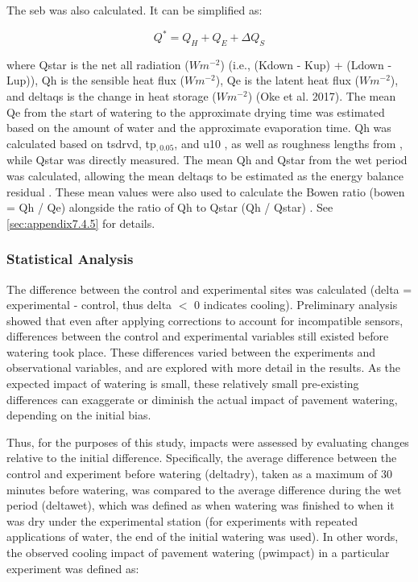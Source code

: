 \documentclass[final,3p,times,authoryear]{elsarticle}
\begin{document}
The \gls{seb} was also calculated. It can be simplified as:

\begin{equation}
Q^{*} = Q_{H} + Q_{E} + \Delta Q_{S}
\label{eq:2.1} 
\end{equation}

where \gls{Qstar} is the net all radiation ($Wm^{-2}$) (i.e., (\gls{Kdown} - \gls{Kup}) + (\gls{Ldown} - \gls{Lup})), \gls{Qh} is the sensible heat flux ($Wm^{-2}$), \gls{Qe} is the latent heat flux ($Wm^{-2}$), and \gls{deltaqs} is the change in heat storage ($Wm^{-2}$) (Oke et al. 2017). The mean \gls{Qe} from the start of watering to the approximate drying time was estimated based on the amount of water and the approximate evaporation time. \gls{Qh} was calculated based on \gls{tsdrvd}, \gls{tp}$_{,0.05}$, and \gls{u10} \citep{Liu2007}, as well as roughness lengths from \cite{Kanda2007}, while \gls{Qstar} was directly measured. The mean \gls{Qh} and \gls{Qstar} from the wet period was calculated, allowing the mean \gls{deltaqs} to be estimated as the energy balance residual \citep{Oke2017}. These mean values were also used to calculate the Bowen ratio (\gls{bowen} = \gls{Qh} / \gls{Qe}) alongside the ratio of \gls{Qh} to \gls{Qstar} (\gls{Qh} / \gls{Qstar}) \citep{Oke2017}. See \ref{sec:appendix7.4.5} for details.


\subsubsection{Statistical Analysis}\label{sec:methods2.2.3}

The difference between the control and experimental sites was calculated (\gls{delta} =
experimental - control, thus \gls{delta} $<$ 0 indicates cooling). Preliminary analysis showed that even after applying corrections to account for
incompatible sensors, differences between the control and experimental variables still
existed before watering took place. These differences varied between the experiments
and observational variables, and are explored with more detail in the results. As the
expected impact of watering is small, these relatively small pre-existing differences can
exaggerate or diminish the actual impact of pavement watering, depending on the initial
bias.

Thus, for the purposes of this study, impacts were assessed by evaluating changes
relative to the initial difference. Specifically, the average difference between the control
and experiment before watering (\gls{deltadry}), taken as a maximum of 30 minutes before
watering, was compared to the average difference during the wet period (\gls{deltawet}), which was defined as when watering was finished to when it was dry under the experimental
station (for experiments with repeated applications of water, the end of the initial
watering was used). In other words, the observed cooling impact of pavement watering
(\gls{pwimpact}) in a particular experiment was defined as:
\end{document}
